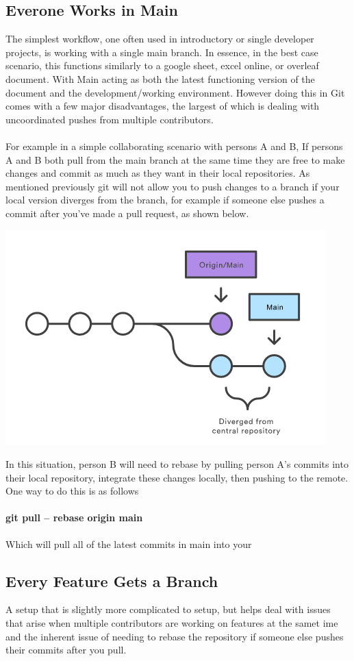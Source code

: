 \documentclass{article}
\begin{document}
\subsection{Everone Works in Main}
The simplest workflow, one often used in introductory or single developer projects, is working with a single main branch. In essence, in the best case scenario, this functions similarly to a google sheet, excel online, or overleaf document. With Main acting as both the latest functioning version of the document and the development/working environment. However doing this in Git comes with a few major disadvantages, the largest of which is dealing with uncoordinated pushes from multiple contributors.
\paragraph{}
For example in a simple collaborating scenario with persons A and B, If persons A and B both pull from the main branch at the same time they are free to make changes and commit as much as they want in their local repositories. 
\label{workflows} As mentioned previously git will not allow you to push changes to a branch if your local version diverges from the branch, for example if someone else pushes a commit after you've made a pull request, as shown below. 
\begin{center}
\includegraphics[width=.7\textwidth]{diverge}
\end{center}
In this situation, person B will need to rebase by pulling person A's commits into their local repository, integrate these changes locally, then pushing to the remote. One way to do this is as follows
\paragraph{git pull -- rebase origin main}
Which will pull all of the latest commits in main into your  
\subsection{Every Feature Gets a Branch}
A setup that is slightly more complicated to setup, but helps deal with issues that arise when multiple contributors are working on features at the samet ime and the inherent issue of needing to rebase the repository if someone else pushes their commits after you pull. 
\end{document}
